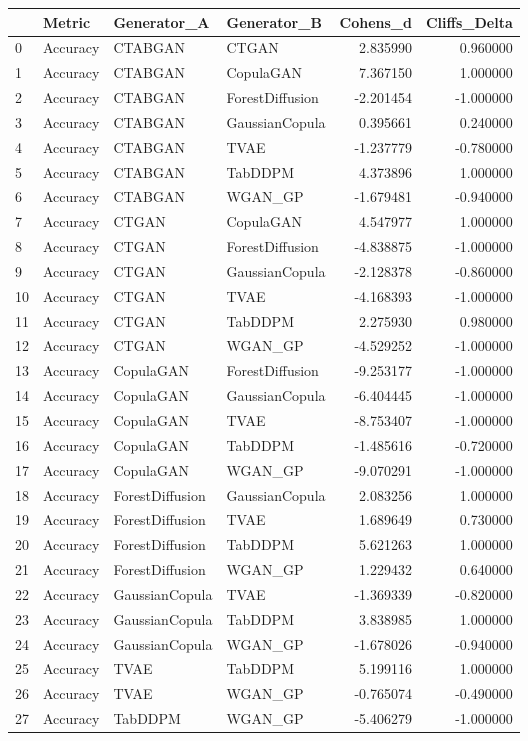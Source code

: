 \begin{tabular}{llllrr}
\toprule
 & Metric & Generator_A & Generator_B & Cohens_d & Cliffs_Delta \\
\midrule
0 & Accuracy & CTABGAN & CTGAN & 2.835990 & 0.960000 \\
1 & Accuracy & CTABGAN & CopulaGAN & 7.367150 & 1.000000 \\
2 & Accuracy & CTABGAN & ForestDiffusion & -2.201454 & -1.000000 \\
3 & Accuracy & CTABGAN & GaussianCopula & 0.395661 & 0.240000 \\
4 & Accuracy & CTABGAN & TVAE & -1.237779 & -0.780000 \\
5 & Accuracy & CTABGAN & TabDDPM & 4.373896 & 1.000000 \\
6 & Accuracy & CTABGAN & WGAN_GP & -1.679481 & -0.940000 \\
7 & Accuracy & CTGAN & CopulaGAN & 4.547977 & 1.000000 \\
8 & Accuracy & CTGAN & ForestDiffusion & -4.838875 & -1.000000 \\
9 & Accuracy & CTGAN & GaussianCopula & -2.128378 & -0.860000 \\
10 & Accuracy & CTGAN & TVAE & -4.168393 & -1.000000 \\
11 & Accuracy & CTGAN & TabDDPM & 2.275930 & 0.980000 \\
12 & Accuracy & CTGAN & WGAN_GP & -4.529252 & -1.000000 \\
13 & Accuracy & CopulaGAN & ForestDiffusion & -9.253177 & -1.000000 \\
14 & Accuracy & CopulaGAN & GaussianCopula & -6.404445 & -1.000000 \\
15 & Accuracy & CopulaGAN & TVAE & -8.753407 & -1.000000 \\
16 & Accuracy & CopulaGAN & TabDDPM & -1.485616 & -0.720000 \\
17 & Accuracy & CopulaGAN & WGAN_GP & -9.070291 & -1.000000 \\
18 & Accuracy & ForestDiffusion & GaussianCopula & 2.083256 & 1.000000 \\
19 & Accuracy & ForestDiffusion & TVAE & 1.689649 & 0.730000 \\
20 & Accuracy & ForestDiffusion & TabDDPM & 5.621263 & 1.000000 \\
21 & Accuracy & ForestDiffusion & WGAN_GP & 1.229432 & 0.640000 \\
22 & Accuracy & GaussianCopula & TVAE & -1.369339 & -0.820000 \\
23 & Accuracy & GaussianCopula & TabDDPM & 3.838985 & 1.000000 \\
24 & Accuracy & GaussianCopula & WGAN_GP & -1.678026 & -0.940000 \\
25 & Accuracy & TVAE & TabDDPM & 5.199116 & 1.000000 \\
26 & Accuracy & TVAE & WGAN_GP & -0.765074 & -0.490000 \\
27 & Accuracy & TabDDPM & WGAN_GP & -5.406279 & -1.000000 \\
\bottomrule
\end{tabular}
